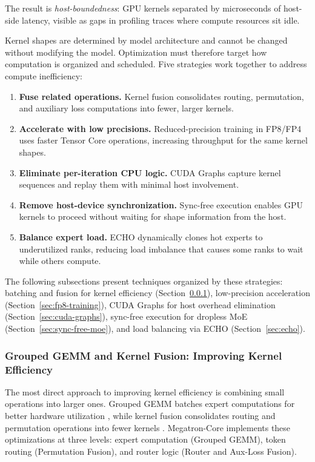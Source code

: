 \documentclass[10pt,logo,copyright]{nvidiatechreport}
\begin{document}
The result is \textit{host-boundedness}: GPU kernels separated by microseconds of host-side latency, visible as gaps in profiling traces where compute resources sit idle.

Kernel shapes are determined by model architecture and cannot be changed without modifying the model. Optimization must therefore target how computation is organized and scheduled. Five strategies work together to address compute inefficiency:

\begin{enumerate}
    \item \textbf{Fuse related operations.} Kernel fusion consolidates routing, permutation, and auxiliary loss computations into fewer, larger kernels.
    \item \textbf{Accelerate with low precisions.} Reduced-precision training in FP8/FP4 uses faster Tensor Core operations, increasing throughput for the same kernel shapes.
    \item \textbf{Eliminate per-iteration CPU logic.} CUDA Graphs capture kernel sequences and replay them with minimal host involvement.
    \item \textbf{Remove host-device synchronization.} Sync-free execution enables GPU kernels to proceed without waiting for shape information from the host.
    \item \textbf{Balance expert load.} ECHO dynamically clones hot experts to underutilized ranks, reducing load imbalance that causes some ranks to wait while others compute.
\end{enumerate}

The following subsections present techniques organized by these strategies: batching and fusion for kernel efficiency (Section~\ref{sec:kernel-fusion}), low-precision acceleration (Section~\ref{sec:fp8-training}), CUDA Graphs for host overhead elimination (Section~\ref{sec:cuda-graphs}), sync-free execution for dropless MoE (Section~\ref{sec:sync-free-moe}), and load balancing via ECHO (Section~\ref{sec:echo}).

\subsubsection{Grouped GEMM and Kernel Fusion: Improving Kernel Efficiency}\label{sec:kernel-fusion}

The most direct approach to improving kernel efficiency is combining small operations into larger ones. Grouped GEMM batches expert computations for better hardware utilization \cite{megablocks}, while kernel fusion consolidates routing and permutation operations into fewer kernels \cite{chen2018tvm}. Megatron-Core implements these optimizations at three levels: expert computation (Grouped GEMM), token routing (Permutation Fusion), and router logic (Router and Aux-Loss Fusion).
\end{document}

